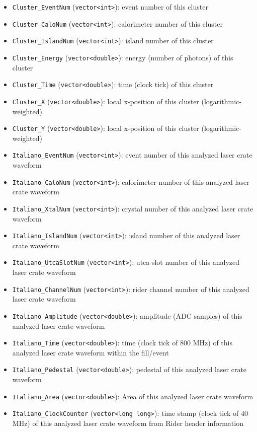 \documentclass[12pt,letterpaper]{article}
\begin{document}
\begin{itemize}
\item \verb+Cluster_EventNum+ (\verb+vector<int>+): event number of this cluster 
\item \verb+Cluster_CaloNum+ (\verb+vector<int>+): calorimeter number of this cluster
\item \verb+Cluster_IslandNum+ (\verb+vector<int>+): island number of this cluster
\item \verb+Cluster_Energy+ (\verb+vector<double>+): energy (number of photons) of this cluster
\item \verb+Cluster_Time+ (\verb+vector<double>+): time (clock tick) of this cluster 
\item \verb+Cluster_X+ (\verb+vector<double>+): local x-position of this cluster (logarithmic-weighted)
\item \verb+Cluster_Y+ (\verb+vector<double>+): local x-position of this cluster (logarithmic-weighted)

\item \verb+Italiano_EventNum+ (\verb+vector<int>+): event number of this analyzed laser crate waveform
\item \verb+Italiano_CaloNum+ (\verb+vector<int>+): calorimeter number of this analyzed laser crate waveform
\item \verb+Italiano_XtalNum+ (\verb+vector<int>+): crystal number of this analyzed laser crate waveform
\item \verb+Italiano_IslandNum+ (\verb+vector<int>+): island number of this analyzed laser crate waveform
\item \verb+Italiano_UtcaSlotNum+ (\verb+vector<int>+): utca slot number of this analyzed laser crate waveform
\item \verb+Italiano_ChannelNum+ (\verb+vector<int>+): rider channel number of this analyzed laser crate waveform
\item \verb+Italiano_Amplitude+ (\verb+vector<double>+): amplitude (ADC samples) of this analyzed laser crate waveform
\item \verb+Italiano_Time+ (\verb+vector<double>+): time (clock tick of 800 MHz) of this analyzed laser crate waveform within the fill/event
\item \verb+Italiano_Pedestal+ (\verb+vector<double>+): pedestal of this analyzed laser crate waveform
\item \verb+Italiano_Area+ (\verb+vector<double>+): Area of this analyzed laser crate waveform
\item \verb+Italiano_ClockCounter+ (\verb+vector<long long>+): time stamp (clock tick of 40 MHz) of this analyzed laser crate waveform from Rider header information
\end{itemize}
\end{document}

